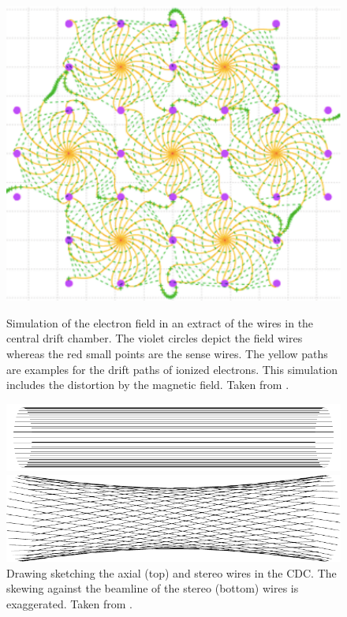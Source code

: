 \begin{figure}
  \caption[Simulation of the electron field in the central drift chamber.]{Simulation of the electron field in an extract of the wires in the central drift chamber. The violet circles depict the field wires whereas the red small points are the sense wires. The yellow paths are examples for the drift paths of ionized electrons. This simulation includes the distortion by the magnetic field. Taken from \cite{cdc_design}.}
  \includegraphics[width=0.5\linewidth]{figures/experimental_setup/electronsInCDC.pdf}
  \label{fig-sense-wires}
\end{figure}


\begin{figure}
  \centering
  \includegraphics{figures/experimental_setup/axialLayers.pdf}
  
  \vspace*{1.5cm}
  
  \includegraphics{figures/experimental_setup/stereoLayers.pdf}
  \caption[Drawing sketching the axial (top) and stereo wires in the CDC.]{Drawing sketching the axial (top) and stereo wires in the CDC. The skewing against the beamline of the stereo (bottom) wires is exaggerated. Taken from \cite{oliver}.}
  \label{fig-axial-stereo}
\end{figure}

